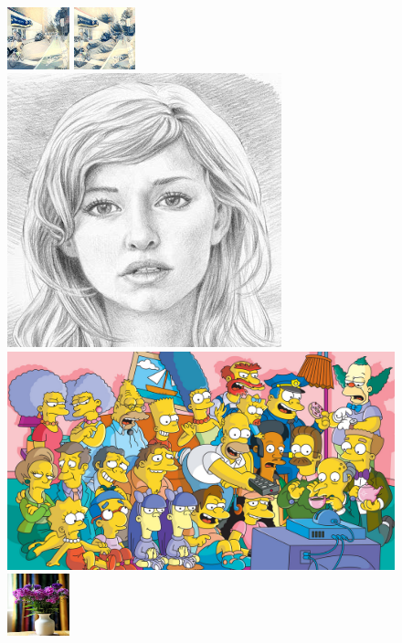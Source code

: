 \documentclass[runningheads]{llncs}
\begin{document}
\begin{figure}
  \includegraphics[width=0.16\textwidth]{47_wave_baseline.jpg}
  \includegraphics[width=0.16\textwidth]{47_wave_mine.jpg} \\
  \hspace*{12mm}
  \includegraphics[height=0.13\textwidth]{girl_sketch.jpg}
  \hspace{8mm}
  \includegraphics[height=0.13\textwidth]{simpsons.jpeg} \\
  \includegraphics[width=0.16\textwidth]{1003_orig.jpg}

\end{figure}
\end{document}
